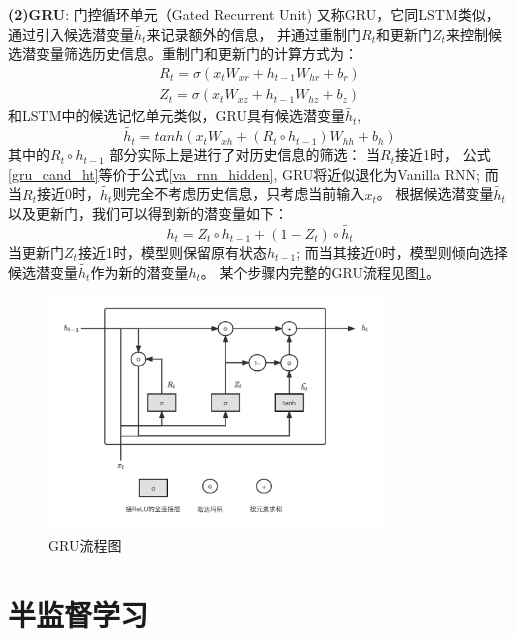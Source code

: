       \textbf{(2)GRU}: 门控循环单元（Gated Recurrent Unit) 又称GRU，它同LSTM类似，
      通过引入候选潜变量$\tilde{h_t}$来记录额外的信息，
      并通过重制门$R_t$和更新门$Z_t$来控制候选潜变量筛选历史信息。重制门和更新门的计算方式为：
      \begin{align}
        R_t = \sigma(x_t W_{xr} + h_{t-1} W_{hr} + b_r) \\
        Z_t = \sigma(x_t W_{xz} + h_{t-1} W_{hz} + b_z) 
      \end{align}
      和LSTM中的候选记忆单元类似，GRU具有候选潜变量$\tilde{h_t}$,
      \begin{equation} \label{gru_cand_ht}
        \tilde{h_t} = tanh(x_t W_{xh} + (R_t \circ h_{t-1})W_{hh} + b_h)
      \end{equation}
      其中的$R_t \circ h_{t-1}$ 部分实际上是进行了对历史信息的筛选：
      当$R_t$接近1时， 公式\ref{gru_cand_ht}等价于公式\ref{va_rnn_hidden},
      GRU将近似退化为Vanilla RNN;
      而当$R_t$接近0时，$\tilde{h_t}$则完全不考虑历史信息，只考虑当前输入$x_t$。
      根据候选潜变量$\tilde{h_t}$以及更新门，我们可以得到新的潜变量如下：
      \begin{equation} \label{gru_ht}
        h_t = Z_t \circ h_{t-1} + (1-Z_t)\circ \tilde{h_t}
      \end{equation}
      当更新门$Z_t$接近1时，模型则保留原有状态$h_{t-1}$;
      而当其接近0时，模型则倾向选择候选潜变量$\tilde{h_t}$作为新的潜变量$h_t$。
      某个步骤内完整的GRU流程见图\ref{pic:gru}。
      \begin{figure}[htbp]
      \centering
      \includegraphics[width=0.8\textwidth]{Figures/GRU.png}
      \caption{GRU流程图}
      \label{pic:gru}
    \end{figure}
  
  \section{半监督学习} \label{sec:B3}

